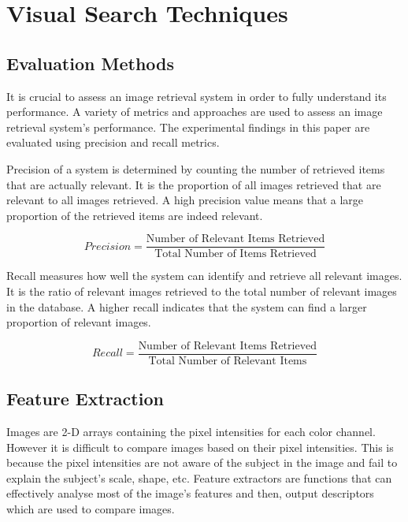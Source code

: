 \section{Visual Search Techniques}
\label{sec:visual_search_techniques}

\subsection{Evaluation Methods}
\label{sec:eval_methods}

It is crucial to assess an image retrieval system in order to fully understand its performance. A variety of metrics
and approaches are used to assess an image retrieval system's performance. The experimental findings in this paper
are evaluated using precision and recall metrics.

Precision of a system is determined by counting the number of retrieved items that are actually relevant.
It is the proportion of all images retrieved that are relevant to all images retrieved. A high precision value means
that a large proportion of the retrieved items are indeed relevant.

\begin{equation}
  Precision = \frac{\text{Number of Relevant Items Retrieved}}{\text{Total Number of Items Retrieved}}
\end{equation}

Recall measures how well the system can identify and retrieve all relevant images. It is the ratio of relevant images
retrieved to the total number of relevant images in the database. A higher recall indicates that the system can find
a larger proportion of relevant images.

\begin{equation}
  Recall = \frac{\text{Number of Relevant Items Retrieved}}{\text{Total Number of Relevant Items}}
\end{equation}

\subsection{Feature Extraction}
\label{sec:feature_extraction_details}

Images are 2-D arrays containing the pixel intensities for each color channel. However it is difficult to compare images
based on their pixel intensities. This is because the pixel intensities are not aware of the subject in the image and
fail to explain the subject's scale, shape, etc. Feature extractors are functions that can effectively analyse most of
the image's features and then, output descriptors which are used to compare images.

